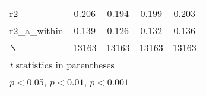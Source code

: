 {\begin{tabular}{l*{4}{c}}
\hline
r2          &       0.206         &       0.194         &       0.199         &       0.203         \\
r2\_a\_within &       0.139         &       0.126         &       0.132         &       0.136         \\
N           &       13163         &       13163         &       13163         &       13163         \\
\hline\hline
\multicolumn{5}{l}{\footnotesize \textit{t} statistics in parentheses}\\
\multicolumn{5}{l}{\footnotesize \sym{*} \(p<0.05\), \sym{**} \(p<0.01\), \sym{***} \(p<0.001\)}\\
\end{tabular}
}

